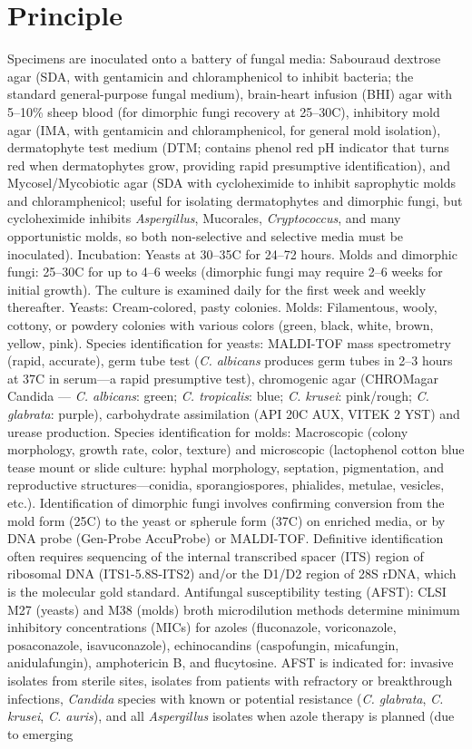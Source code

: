 \section*{Principle}
Specimens are inoculated onto a battery of fungal media: Sabouraud dextrose agar (SDA, with gentamicin and chloramphenicol to inhibit bacteria; the standard general-purpose fungal medium), brain-heart infusion (BHI) agar with 5--10\% sheep blood (for dimorphic fungi recovery at 25--30\textdegree{}C), inhibitory mold agar (IMA, with gentamicin and chloramphenicol, for general mold isolation), dermatophyte test medium (DTM; contains phenol red pH indicator that turns red when dermatophytes grow, providing rapid presumptive identification), and Mycosel/Mycobiotic agar (SDA with cycloheximide to inhibit saprophytic molds and chloramphenicol; useful for isolating dermatophytes and dimorphic fungi, but cycloheximide inhibits \textit{Aspergillus}, Mucorales, \textit{Cryptococcus}, and many opportunistic molds, so both non-selective and selective media must be inoculated). Incubation: Yeasts at 30--35\textdegree{}C for 24--72 hours. Molds and dimorphic fungi: 25--30\textdegree{}C for up to 4--6 weeks (dimorphic fungi may require 2--6 weeks for initial growth). The culture is examined daily for the first week and weekly thereafter. Yeasts: Cream-colored, pasty colonies. Molds: Filamentous, wooly, cottony, or powdery colonies with various colors (green, black, white, brown, yellow, pink). Species identification for yeasts: MALDI-TOF mass spectrometry (rapid, accurate), germ tube test (\textit{C. albicans} produces germ tubes in 2--3 hours at 37\textdegree{}C in serum---a rapid presumptive test), chromogenic agar (CHROMagar Candida --- \textit{C. albicans}: green; \textit{C. tropicalis}: blue; \textit{C. krusei}: pink/rough; \textit{C. glabrata}: purple), carbohydrate assimilation (API 20C AUX, VITEK 2 YST) and urease production. Species identification for molds: Macroscopic (colony morphology, growth rate, color, texture) and microscopic (lactophenol cotton blue tease mount or slide culture: hyphal morphology, septation, pigmentation, and reproductive structures---conidia, sporangiospores, phialides, metulae, vesicles, etc.). Identification of dimorphic fungi involves confirming conversion from the mold form (25\textdegree{}C) to the yeast or spherule form (37\textdegree{}C) on enriched media, or by DNA probe (Gen-Probe AccuProbe) or MALDI-TOF. Definitive identification often requires sequencing of the internal transcribed spacer (ITS) region of ribosomal DNA (ITS1-5.8S-ITS2) and/or the D1/D2 region of 28S rDNA, which is the molecular gold standard. Antifungal susceptibility testing (AFST): CLSI M27 (yeasts) and M38 (molds) broth microdilution methods determine minimum inhibitory concentrations (MICs) for azoles (fluconazole, voriconazole, posaconazole, isavuconazole), echinocandins (caspofungin, micafungin, anidulafungin), amphotericin B, and flucytosine. AFST is indicated for: invasive isolates from sterile sites, isolates from patients with refractory or breakthrough infections, \textit{Candida} species with known or potential resistance (\textit{C. glabrata}, \textit{C. krusei}, \textit{C. auris}), and all \textit{Aspergillus} isolates when azole therapy is planned (due to emerging 